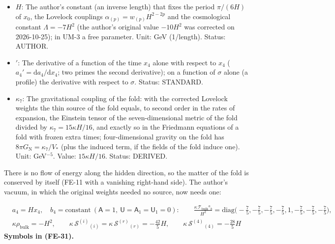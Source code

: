 \documentclass[
  10pt,
]{article}
\begin{document}
\begin{itemize}
  Status: STANDARD.
\item
  \(H\): The author's constant (an inverse length) that fixes the period
  \(\pi/(6H)\) of \(x_0\), the Lovelock couplings
  \(\alpha_{(p)} = w_{(p)}H^{2-2p}\) and the cosmological constant
  \(\Lambda = -7H^2\) (the author's original value \(-10H^2\) was
  corrected on 2026-10-25); in UM-3 a free parameter. Unit: GeV
  (1/length). Status: AUTHOR.
\item
  \({}'\): The derivative of a function of the time \(x_4\) alone with
  respect to \(x_4\) (\(a_4' = \mathrm{d}a_4/\mathrm{d}x_4\); two primes
  the second derivative); on a function of \(\sigma\) alone (a profile)
  the derivative with respect to \(\sigma\). Status: STANDARD.
\item
  \(\kappa_7\): The gravitational coupling of the fold: with the
  corrected Lovelock weights the thin source of the fold equals, to
  second order in the rates of expansion, the Einstein tensor of the
  seven-dimensional metric of the fold divided by
  \(\kappa_7 = 15\kappa H/16\), and exactly so in the Friedmann
  equations of a fold with frozen extra times; four-dimensional gravity
  on the fold has \(8\pi G_{\mathrm{N}} = \kappa_7/V_*\) (plus the
  induced term, if the fields of the fold induce one). Unit:
  GeV\(^{-5}\). Value: \(15\kappa H/16\). Status: DERIVED.
\end{itemize}

There is no flow of energy along the hidden direction, so the matter of
the fold is conserved by itself (FE-11 with a vanishing right-hand
side). The author's vacuum, in which the original weights needed no
source, now needs one:

\[
\begin{aligned}
&a_4 = Hx_4,\quad b_4 = \text{constant}\ (\mathsf{A} = 1,\ \mathsf{U} = \mathsf{A}_1 = \mathsf{U}_1 = 0):\qquad
 \frac{\kappa\,\mathcal{T}_{\mathrm{bulk}}{}^a{}_b}{H^2} = \mathrm{diag}\Big(-\frac75, -\frac75, -\frac75, -\frac75, 1, -\frac75, -\frac75, -\frac75\Big),\\
&\kappa\rho_{\mathrm{bulk}} = -H^2,\qquad \kappa\,\mathcal{S}^{(i)}{}_{(i)} = \kappa\,\mathcal{S}^{(r)}{}_{(r)} = -\frac{42}{5}H,\qquad
 \kappa\,\mathcal{S}^{(4)}{}_{(4)} = -\frac{28}{5}H
\end{aligned} \tag{FE-31}
\] \textbf{Symbols in (FE-31).}
\end{document}
